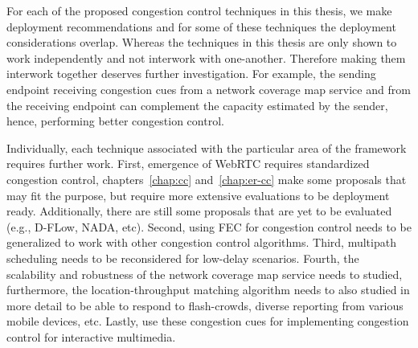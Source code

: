 For each of the proposed congestion control techniques in this thesis, we make
deployment recommendations and for some of these techniques the deployment
considerations overlap. Whereas the techniques in this thesis are only shown
to work independently and not interwork with one-another. Therefore making
them interwork together deserves further investigation. For example, the
sending endpoint receiving congestion cues from a network coverage map service
and from the receiving endpoint can complement the capacity estimated by the
sender, hence, performing better congestion control.

Individually, each technique associated with the particular area of the
framework requires further work. First, emergence of WebRTC requires
standardized congestion control, chapters~\ref{chap:cc} and~\ref{chap:er-cc}
make some proposals that may fit the purpose, but require more extensive
evaluations to be deployment ready. Additionally, there are still some
proposals that are yet to be evaluated (e.g., D-FLow, NADA, etc). Second,
using FEC for congestion control needs to be generalized to work with other
congestion control algorithms. Third, multipath scheduling needs to be
reconsidered for low-delay scenarios. Fourth, the scalability and robustness
of the network coverage map service needs to studied, furthermore, the
location-throughput matching algorithm needs to also studied in more detail to
be able to respond to flash-crowds, diverse reporting from various mobile
devices, etc. Lastly, use these congestion cues for implementing congestion
control for interactive multimedia.



